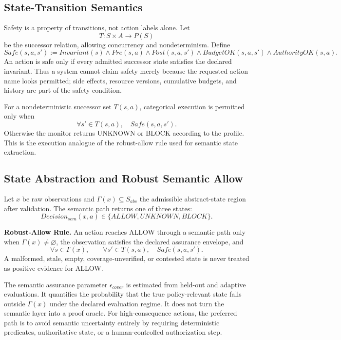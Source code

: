 \documentclass[11pt]{article}
\def\ensuremath#1{#1}%
\def\mathrm#1{#1}%
\def\mathsf#1{#1}%
\def\mathcal#1{#1}%
\newcommand{\epscover}{\ensuremath{\epsilon_{\mathrm{cover}}}}
\newcommand{\Safe}{\ensuremath{\mathsf{Safe}}}
\newcommand{\ALLOW}{\ensuremath{\mathsf{ALLOW}}}
\newcommand{\BLOCK}{\ensuremath{\mathsf{BLOCK}}}
\newcommand{\UNKNOWN}{\ensuremath{\mathsf{UNKNOWN}}}
\begin{document}
\subsection{State-Transition Semantics}
Safety is a property of transitions, not action labels alone. Let
\[
T:S\times A\rightarrow \mathcal{P}(S)
\]
be the successor relation, allowing concurrency and nondeterminism. Define
\[
\Safe(s,a,s') := \mathrm{Invariant}(s)\land\mathrm{Pre}(s,a)\land\mathrm{Post}(s,a,s')\land\mathrm{BudgetOK}(s,a,s')\land\mathrm{AuthorityOK}(s,a).
\]
An action is safe only if every admitted successor state satisfies the declared invariant. Thus a system cannot claim safety merely because the requested action name looks permitted; side effects, resource versions, cumulative budgets, and history are part of the safety condition.

For a nondeterministic successor set \(T(s,a)\), categorical execution is permitted only when
\[
\forall s'\in T(s,a),\quad \Safe(s,a,s').
\]
Otherwise the monitor returns \UNKNOWN{} or \BLOCK{} according to the profile. This is the execution analogue of the robust-allow rule used for semantic state extraction.

\subsection{State Abstraction and Robust Semantic Allow}
Let \(x\) be raw observations and \(\Gamma(x)\subseteq S_{abs}\) the admissible abstract-state region after validation. The semantic path returns one of three states:
\[
\mathrm{Decision}_{sem}(x,a)\in\{\ALLOW,\UNKNOWN,\BLOCK\}.
\]
\begin{keyresult}
\textbf{Robust-Allow Rule.} An action reaches \ALLOW{} through a semantic path only when \(\Gamma(x)\neq\varnothing\), the observation satisfies the declared assurance envelope, and
\[
\forall s\in\Gamma(x),\qquad \forall s'\in T(s,a),\quad \Safe(s,a,s').
\]
A malformed, stale, empty, coverage-unverified, or contested state is never treated as positive evidence for \ALLOW{}.
\end{keyresult}

The semantic assurance parameter \(\epscover\) is estimated from held-out and adaptive evaluations. It quantifies the probability that the true policy-relevant state falls outside \(\Gamma(x)\) under the declared evaluation regime. It does not turn the semantic layer into a proof oracle. For high-consequence actions, the preferred path is to avoid semantic uncertainty entirely by requiring deterministic predicates, authoritative state, or a human-controlled authorization step.
\end{document}
